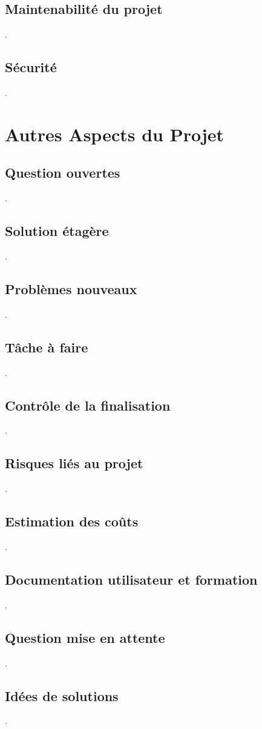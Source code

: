 		\subsection{Maintenabilité du projet}
		.
		\subsection{Sécurité}
		.
	\section{Autres Aspects du Projet}
		\subsection{Question ouvertes}
		.
		\subsection{Solution étagère}
		.
		\subsection{Problèmes nouveaux}
		.
		\subsection{Tâche à faire}
		.
		\subsection{Contrôle de la finalisation}
		.
		\subsection{Risques liés au projet}
		.
		\subsection{Estimation des coûts}
		.
		\subsection{Documentation utilisateur et formation}
		.
		\subsection{Question mise en attente}
		.
		\subsection{Idées de solutions}
		.

